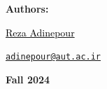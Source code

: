 \documentclass[12pt	]{article}
\begin{document}
\begin{flushleft}
    \textbf{\selectfont Authors:}
\end{flushleft}

\begin{center}
    \begin{minipage}{0.5\textwidth}
        \begin{flushleft}
            \href{https://rezaadinepour.github.io/}{\textcolor{black}{Reza Adinepour}}\\
        \end{flushleft}
    \end{minipage}%
    \begin{minipage}{0.5\textwidth}
        \begin{flushright}
            \href{mailto:adinepour@aut.ac.ir}{\texttt{adinepour@aut.ac.ir}}
        \end{flushright}
    \end{minipage}
\end{center}

\vspace{1em}

    
\begin{center}
    \bigskip \bigskip \bigskip \bigskip
    \large \bf {}\selectfont Fall 2024
\end{center}

\thispagestyle{empty}

\setcounter{page}{0}

\newpage

\tableofcontents

\newpage



\end{document}
